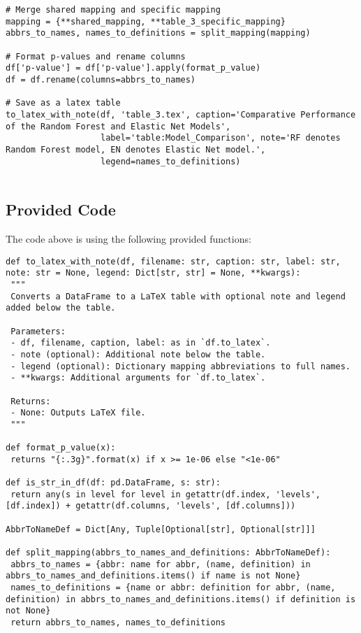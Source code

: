 \documentclass[11pt]{article}
\begin{document}
\begin{verbatim}
# Merge shared mapping and specific mapping
mapping = {**shared_mapping, **table_3_specific_mapping}
abbrs_to_names, names_to_definitions = split_mapping(mapping)

# Format p-values and rename columns
df['p-value'] = df['p-value'].apply(format_p_value)
df = df.rename(columns=abbrs_to_names)

# Save as a latex table
to_latex_with_note(df, 'table_3.tex', caption='Comparative Performance of the Random Forest and Elastic Net Models', 
                   label='table:Model_Comparison', note='RF denotes Random Forest model, EN denotes Elastic Net model.', 
                   legend=names_to_definitions)  


\end{verbatim}

\subsection{Provided Code}
The code above is using the following provided functions:

\begin{verbatim}
def to_latex_with_note(df, filename: str, caption: str, label: str, note: str = None, legend: Dict[str, str] = None, **kwargs):
 """
 Converts a DataFrame to a LaTeX table with optional note and legend added below the table.

 Parameters:
 - df, filename, caption, label: as in `df.to_latex`.
 - note (optional): Additional note below the table.
 - legend (optional): Dictionary mapping abbreviations to full names.
 - **kwargs: Additional arguments for `df.to_latex`.

 Returns:
 - None: Outputs LaTeX file.
 """

def format_p_value(x):
 returns "{:.3g}".format(x) if x >= 1e-06 else "<1e-06"

def is_str_in_df(df: pd.DataFrame, s: str):
 return any(s in level for level in getattr(df.index, 'levels', [df.index]) + getattr(df.columns, 'levels', [df.columns]))

AbbrToNameDef = Dict[Any, Tuple[Optional[str], Optional[str]]]

def split_mapping(abbrs_to_names_and_definitions: AbbrToNameDef):
 abbrs_to_names = {abbr: name for abbr, (name, definition) in abbrs_to_names_and_definitions.items() if name is not None}
 names_to_definitions = {name or abbr: definition for abbr, (name, definition) in abbrs_to_names_and_definitions.items() if definition is not None}
 return abbrs_to_names, names_to_definitions

\end{verbatim}
\end{document}

